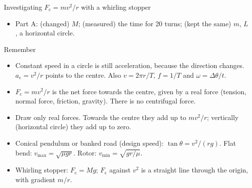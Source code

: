 \begin{experiment}{Investigating $F_\mathrm{c} = mv^2/r$ with a whirling stopper}
{\begin{itemize}
          against $r$. \textbf{Part C:} use 1, 2, 3, 4 identical stoppers (keep $M$, $L$); plot
          $v^2$ against $1/m$.
    \item Part A:  (changed) $M$; 
          (measured) the time for 20 turns;  (kept the same) $m$,
          $L$, a horizontal circle.
  \end{itemize}}
\end{experiment}

\begin{summarybox}[unbreakable]{Remember}
\begin{itemize}
  \item Constant speed in a circle is still acceleration, because the direction changes.
        $a_\mathrm{c} = v^2/r$ points to the centre. Also $v = 2\pi r/T$,
        $f = 1/T$ and $\omega = \Delta\theta/t$.
  \item $F_\mathrm{c} = mv^2/r$ is the net force towards the centre, given by a real
        force (tension, normal force, friction, gravity). There is no centrifugal force.
  \item Draw only real forces. Towards the centre they add up to $mv^2/r$; vertically
        (horizontal circle) they add up to zero.
  \item Conical pendulum or banked road (design speed): $\tan\theta = v^2/(rg)$.
        Flat bend: $v_\mathrm{max} = \sqrt{\mu g r}$. Rotor: $v_\mathrm{min} = \sqrt{gr/\mu}$.
  \item Whirling stopper: $F_\mathrm{c} = Mg$; $F_\mathrm{c}$ against $v^2$ is a straight line
        through the origin, with gradient $m/r$.
\end{itemize}
\end{summarybox}
